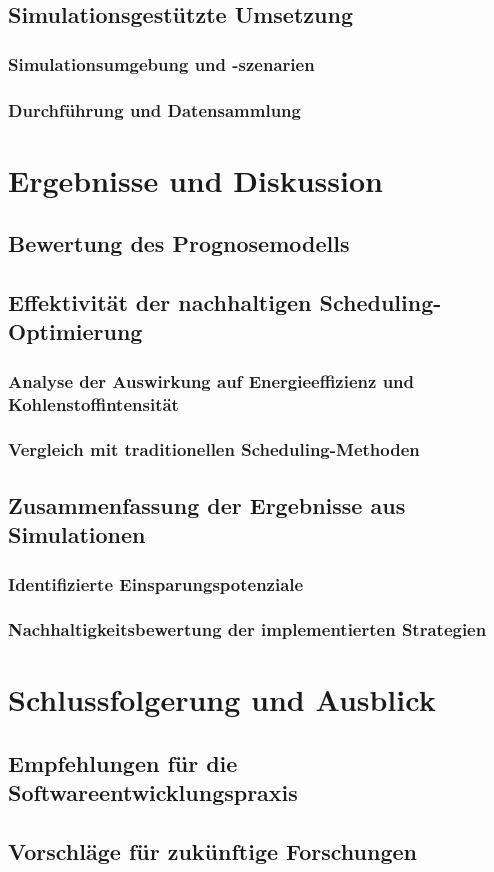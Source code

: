 \section{Simulationsgestützte Umsetzung}
\subsection{Simulationsumgebung und -szenarien}
\subsection{Durchführung und Datensammlung}

\chapter{Ergebnisse und Diskussion}
\section{Bewertung des Prognosemodells}
\section{Effektivität der nachhaltigen Scheduling-Optimierung}
\subsection{Analyse der Auswirkung auf Energieeffizienz und Kohlenstoffintensität}
\subsection{Vergleich mit traditionellen Scheduling-Methoden}
\section{Zusammenfassung der Ergebnisse aus Simulationen}
\subsection{Identifizierte Einsparungspotenziale}
\subsection{Nachhaltigkeitsbewertung der implementierten Strategien}

\chapter{Schlussfolgerung und Ausblick}
\section{Empfehlungen für die Softwareentwicklungspraxis}
\section{Vorschläge für zukünftige Forschungen}
